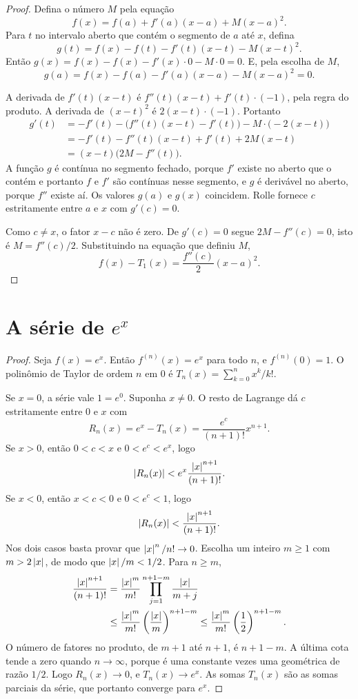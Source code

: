 \documentclass[11pt,a4paper]{article}
\begin{document}
\begin{proof}
Defina o número \(M\) pela equação
\[
f(x)=f(a)+f'(a)(x-a)+M(x-a)^2.
\]
Para \(t\) no intervalo aberto que contém o segmento de \(a\) até \(x\), defina
\[
g(t)=f(x)-f(t)-f'(t)(x-t)-M(x-t)^2.
\]
Então \(g(x)=f(x)-f(x)-f'(x)\cdot 0-M\cdot 0=0\). E, pela escolha de \(M\),
\[
g(a)=f(x)-f(a)-f'(a)(x-a)-M(x-a)^2=0.
\]

A derivada de \(f'(t)(x-t)\) é \(f''(t)(x-t)+f'(t)\cdot(-1)\), pela regra do produto. A derivada de \((x-t)^2\) é \(2(x-t)\cdot(-1)\). Portanto
\begin{align*}
g'(t)
&=-f'(t)-\bigl(f''(t)(x-t)-f'(t)\bigr)-M\cdot\bigl(-2(x-t)\bigr)\\
&=-f'(t)-f''(t)(x-t)+f'(t)+2M(x-t)\\
&=(x-t)\bigl(2M-f''(t)\bigr).
\end{align*}
A função \(g\) é contínua no segmento fechado, porque \(f'\) existe no aberto que o contém e portanto \(f\) e \(f'\) são contínuas nesse segmento, e \(g\) é derivável no aberto, porque \(f''\) existe aí. Os valores \(g(a)\) e \(g(x)\) coincidem. Rolle fornece \(c\) estritamente entre \(a\) e \(x\) com \(g'(c)=0\).

Como \(c\neq x\), o fator \(x-c\) não é zero. De \(g'(c)=0\) segue \(2M-f''(c)=0\), isto é \(M=f''(c)/2\). Substituindo na equação que definiu \(M\),
\[
f(x)-T_1(x)=\frac{f''(c)}{2}(x-a)^2.
\]
\end{proof}

\section{A série de \(e^x\)}

\begin{proof}
Seja \(f(x)=e^x\). Então \(f^{(n)}(x)=e^x\) para todo \(n\), e \(f^{(n)}(0)=1\). O polinômio de Taylor de ordem \(n\) em \(0\) é \(T_n(x)=\sum_{k=0}^n x^k/k!\).

Se \(x=0\), a série vale \(1=e^0\). Suponha \(x\neq 0\). O resto de Lagrange dá \(c\) estritamente entre \(0\) e \(x\) com
\[
R_n(x)=e^x-T_n(x)=\frac{e^{c}}{(n+1)!}x^{n+1}.
\]
Se \(x>0\), então \(0<c<x\) e \(0<e^c<e^x\), logo
\[
\left\lvert R_n(x) \right\rvert<e^x\frac{\left\lvert x \right\rvert^{n+1}}{(n+1)!}.
\]
Se \(x<0\), então \(x<c<0\) e \(0<e^c<1\), logo
\[
\left\lvert R_n(x) \right\rvert<\frac{\left\lvert x \right\rvert^{n+1}}{(n+1)!}.
\]
Nos dois casos basta provar que \(\left\lvert x \right\rvert^{n}/n!\to 0\). Escolha um inteiro \(m\ge 1\) com \(m>2\left\lvert x \right\rvert\), de modo que \(\left\lvert x \right\rvert/m<1/2\). Para \(n\ge m\),
\begin{align*}
\frac{\left\lvert x \right\rvert^{n+1}}{(n+1)!}
&=\frac{\left\lvert x \right\rvert^{m}}{m!}\prod_{j=1}^{n+1-m}\frac{\left\lvert x \right\rvert}{m+j}\\
&\le\frac{\left\lvert x \right\rvert^{m}}{m!}\left(\frac{\left\lvert x \right\rvert}{m}\right)^{n+1-m}
\le\frac{\left\lvert x \right\rvert^{m}}{m!}\left(\frac{1}{2}\right)^{n+1-m}.
\end{align*}
O número de fatores no produto, de \(m+1\) até \(n+1\), é \(n+1-m\). A última cota tende a zero quando \(n\to\infty\), porque é uma constante vezes uma geométrica de razão \(1/2\). Logo \(R_n(x)\to 0\), e \(T_n(x)\to e^x\). As somas \(T_n(x)\) são as somas parciais da série, que portanto converge para \(e^x\).
\end{proof}
\end{document}

